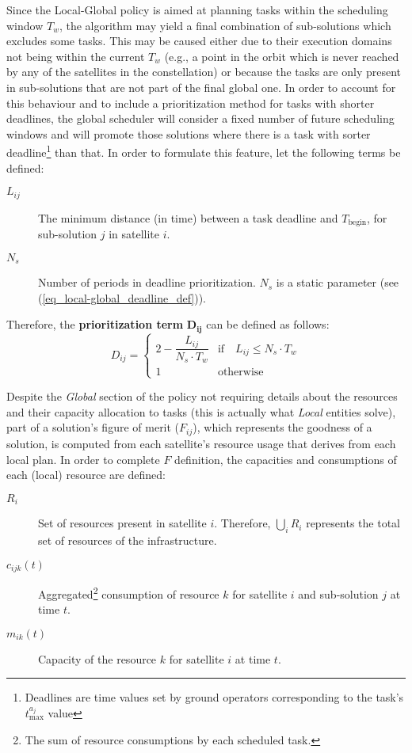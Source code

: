 Since the Local-Global policy is aimed at planning tasks within the scheduling window $T_w$, the algorithm may yield a final combination of sub-solutions which excludes some tasks. This may be caused either due to their execution domains not being within the current $T_w$ (e.g., a point in the orbit which is never reached by any of the satellites in the constellation) or because the tasks are only present in sub-solutions that are not part of the final global one. In order to account for this behaviour and to include a prioritization method for tasks with shorter deadlines, the global scheduler will consider a fixed number of future scheduling windows and will promote those solutions where there is a task with sorter deadline\footnote{Deadlines are time values set by ground operators corresponding to the task's $t_{\text{max}}^{a_j}$ value} than that. In order to formulate this feature, let the following terms be defined:
\begin{description}%
\item[$L_{ij}$] The minimum distance (in time) between a task deadline and $T_\text{begin}$, for sub-solution $j$ in satellite $i$. 
\item[$N_s$] Number of periods in deadline prioritization. $N_s$ is a static parameter (see (\ref{eq_local-global_deadline_def})). 
\end{description}

Therefore, the \textbf{prioritization term} $\mathbf{D_{ij}}$ can be defined as follows:
\begin{equation}
\label{eq_local-global_deadline_def}
D_{ij} = 
\begin{cases}
2-\dfrac{L_{ij}}{N_s \cdot T_w} & \text{if} \quad L_{ij} \leq N_s \cdot T_w\\
1 & \text{otherwise}
\end{cases}
\end{equation}

Despite the \emph{Global} section of the policy not requiring details about the resources and their capacity allocation to tasks (this is actually what \emph{Local} entities solve), part of a solution's figure of merit ($F_{ij}$), which represents the goodness of a solution, is computed from each satellite's resource usage that derives from each local plan. In order to complete $F$ definition, the capacities and consumptions of each (local) resource are defined:

\begin{description}
\item[$R_i$] Set of resources present in satellite $i$. Therefore, $\bigcup_i{R_i}$ represents the total set of resources of the infrastructure.
\item[$c_{ijk}(t)$] Aggregated\footnote{The sum of resource consumptions by each scheduled task.} consumption of resource $k$ for satellite $i$ and sub-solution $j$ at time $t$.
\item[$m_{ik}(t)$] Capacity of the resource $k$ for satellite $i$ at time $t$.
\end{description}

